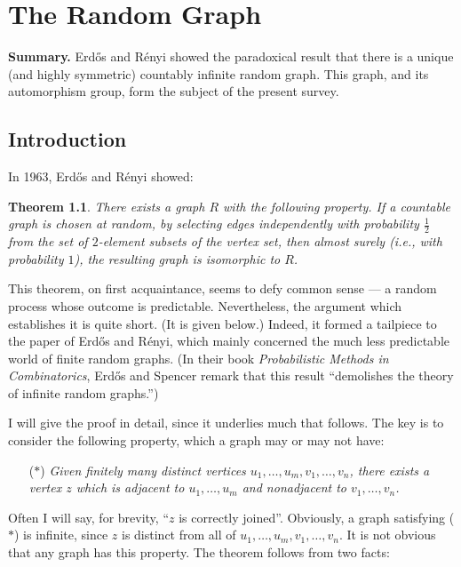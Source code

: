 \documentclass{book}
\newtheorem{theorem}{Theorem}
\begin{document}
\chapter{The Random Graph}
\label{ch32:chap32}

%

\textbf{Summary.} Erd\H{o}s and R\'{e}nyi showed the paradoxical
result that there is a unique (and highly symmetric) countably
infinite random graph. This graph, and its automorphism group, form
the subject of the present survey.

\section{Introduction}%
\label{ch32:sec2.1}

In 1963, Erd\H{o}s and R\'{e}nyi \cite{ch32:bib18} showed:
\begin{theorem}\label{ch32:them1.1} 
There exists a graph $R$ with the following
property. If a countable graph is chosen at random, by selecting
edges independently with probability $\frac{1}{2}$ from the set of
$2$-element subsets of the vertex set, then almost surely (i.e., with
probability $1$), the resulting graph is isomorphic to $R$.
\end{theorem}

This theorem, on first acquaintance, seems to defy common sense --- a
random process whose outcome is predictable. Nevertheless, the
argument which establishes it is quite short. (It is given below.)
Indeed, it formed a tailpiece to the paper of Erd\H{o}s and
R\'{e}nyi, which mainly concerned the much less predictable world of
finite random graphs. (In their book \emph{Probabilistic Methods in
Combinatorics}, Erd\H{o}s and Spencer \cite{ch32:bib19} remark that
this result ``demolishes the theory of infinite random graphs.'')

I will give the proof in detail, since it underlies much that
follows. The key is to consider the following property, which a
graph may or may not have:
\begin{itemize}
\item[($\ast$)] \emph{Given finitely many distinct vertices $u_1, \ldots, u_m, v_1, \ldots, v_n$, there exists a vertex $z$ which is adjacent to $u_1,\ldots, u_m$ and nonadjacent to $v_1,\ldots,v_n$.}
\end{itemize}
Often I will say, for brevity, ``$z$ is correctly joined''.
Obviously, a graph satisfying ($\ast$) is infinite, since $z$ is
distinct from all of $u_1, \ldots, u_m, v_1, \ldots, v_n$. It is
not obvious that any graph has this property. The theorem follows
from two facts:
\end{document}
